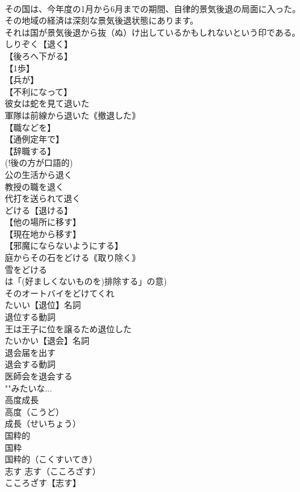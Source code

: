 \documentclass[8pt]{extreport}
\begin{document}
\begin{CJK}{UTF8}{min}
\\	その国は、今年度の1月から6月までの期間、自律的景気後退の局面に入った。
\\	その地域の経済は深刻な景気後退状態にあります。
\\	それは国が景気後退から抜（ぬ）け出しているかもしれないという印である。
\\	しりぞく【退く】
\\	【後ろへ下がる】
\\	【1歩】
\\	【兵が】
\\	【不利になって】
\\	彼女は蛇を見て退いた
\\	軍隊は前線から退いた｟撤退した｠
\\	【職などを】
\\	【通例定年で】
\\	【辞職する】
\\	(!後の方が口語的) 
\\	公の生活から退く
\\	教授の職を退く
\\	代打を送られて退く
\\	どける【退ける】
\\	【他の場所に移す】
\\	【現在地から移す】
\\	【邪魔にならないようにする】
\\	庭からその石をどける｟取り除く｠
\\	雪をどける
\\	は「(好ましくないものを)排除する」の意)
\\	そのオートバイをどけてくれ
\\	たいい【退位】名詞
\\	退位する動詞
\\	王は王子に位を譲るため退位した
\\	たいかい【退会】名詞
\\	退会届を出す
\\	退会する動詞
\\	医師会を退会する
\\	""みたいな...
\\	高度成長		
\\	高度（こうど）
\\	成長（せいちょう）
\\	国粋的		
\\	国粋　
\\	国粋的（こくすいてき）
\\	志す		志す（こころざす）
\\	こころざす【志す】

\end{CJK}
\end{document}
